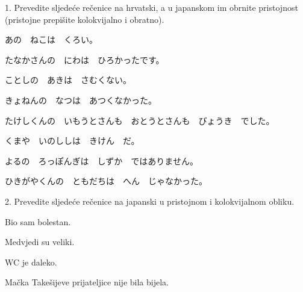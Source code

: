 
\author{Tomislav Mamić}

		
	\begin{mondai}{1. Prevedite sljedeće rečenice na hrvatski, a u japanskom im obrnite pristojnost (pristojne prepišite kolokvijalno i obratno).}
		\item あの　ねこは　くろい。
		\item たなかさんの　にわは　ひろかったです。
		\item ことしの　あきは　さむくない。
		\item きょねんの　なつは　あつくなかった。
		\item たけしくんの　いもうとさんも　おとうとさんも　びょうき　でした。
		\item くまや　いのししは　きけん　だ。
		\item よるの　ろっぽんぎは　しずか　ではありません。
		\item ひきがやくんの　ともだちは　へん　じゃなかった。
	\end{mondai}

	\begin{mondai}{2. Prevedite sljedeće rečenice na japanski u pristojnom i kolokvijalnom obliku.}
		\item Bio sam bolestan.
		\item Medvjedi su veliki.
		\item WC je daleko.
		\item Mačka Takešijeve prijateljice nije bila bijela.
	\end{mondai}
